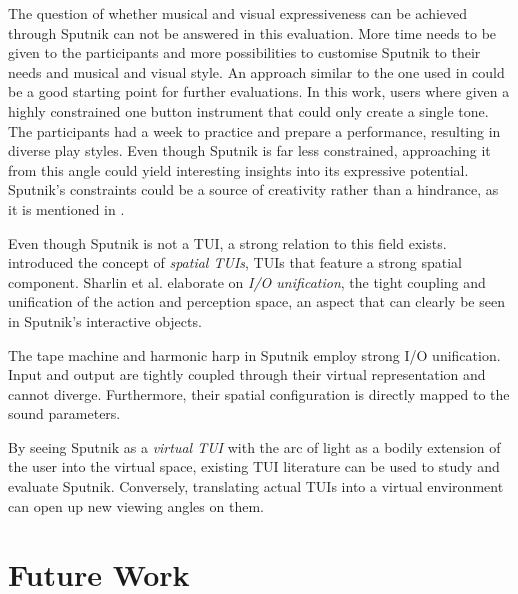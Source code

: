 \documentclass[10pt,a4paper]{scrartcl}
\begin{document}
	
The question of whether musical and visual expressiveness can be achieved through Sputnik can not be answered in this evaluation. More time needs to be given to the participants and more possibilities to customise Sputnik to their needs and musical and visual style. An approach similar to the one used in \cite{Gurevich2010} could be a good starting point for further evaluations. In this work, users where given a highly constrained one button instrument that could only create a single tone. The participants had a week to practice and prepare a performance, resulting in  diverse play styles. Even though Sputnik is far less constrained, approaching it from this angle could yield interesting insights into its expressive potential. Sputnik's constraints could be a source of creativity rather than a hindrance, as it is mentioned in \cite{Magnusson2010}. 


Even though Sputnik is not a TUI, a strong relation to this field exists. \cite{Sharlin2004} introduced the concept of \emph{spatial TUIs}, TUIs that feature a strong spatial component. Sharlin et al. elaborate on \emph{I/O unification}, the tight coupling and unification of the action and perception space, an aspect that can clearly be seen in Sputnik's interactive objects.

The tape machine and harmonic harp in Sputnik employ strong I/O unification. Input and output are tightly coupled through their virtual representation and cannot diverge. Furthermore, their spatial configuration is directly mapped to the sound parameters. 

By seeing Sputnik as a \emph{virtual TUI} with the arc of light as a bodily extension of the user into the virtual space, existing TUI literature can be used to study and evaluate Sputnik. Conversely, translating actual TUIs into a virtual environment can open up new viewing angles on them.


\section{Future Work}
\end{document}
